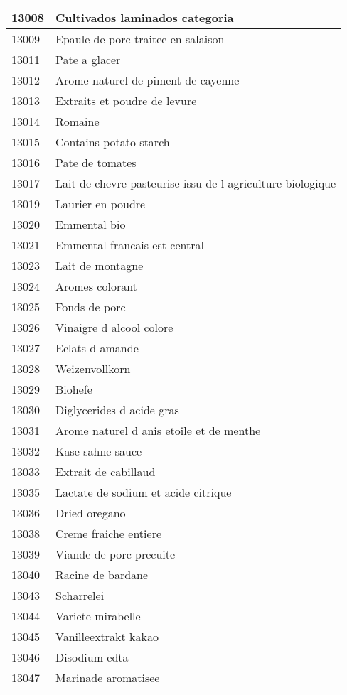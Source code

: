 \begin{longtable}{|l|l|}
13008 & Cultivados laminados categoria \\ \hline 
13009 & Epaule de porc traitee en salaison \\ \hline 
13011 & Pate a glacer \\ \hline 
13012 & Arome naturel de piment de cayenne \\ \hline 
13013 & Extraits et poudre de levure \\ \hline 
13014 & Romaine \\ \hline 
13015 & Contains potato starch \\ \hline 
13016 & Pate de tomates \\ \hline 
13017 & Lait de chevre pasteurise issu de l agriculture biologique \\ \hline 
13019 & Laurier en poudre \\ \hline 
13020 & Emmental bio \\ \hline 
13021 & Emmental francais est central \\ \hline 
13023 & Lait de montagne \\ \hline 
13024 & Aromes colorant \\ \hline 
13025 & Fonds de porc \\ \hline 
13026 & Vinaigre d alcool colore \\ \hline 
13027 & Eclats d amande \\ \hline 
13028 & Weizenvollkorn \\ \hline 
13029 & Biohefe \\ \hline 
13030 & Diglycerides d acide gras \\ \hline 
13031 & Arome naturel d anis etoile et de menthe \\ \hline 
13032 & Kase sahne sauce \\ \hline 
13033 & Extrait de cabillaud \\ \hline 
13035 & Lactate de sodium et acide citrique \\ \hline 
13036 & Dried oregano \\ \hline 
13038 & Creme fraiche entiere \\ \hline 
13039 & Viande de porc precuite \\ \hline 
13040 & Racine de bardane \\ \hline 
13043 & Scharrelei \\ \hline 
13044 & Variete mirabelle \\ \hline 
13045 & Vanilleextrakt kakao \\ \hline 
13046 & Disodium edta \\ \hline 
13047 & Marinade aromatisee \\ \hline 

\end{longtable}
